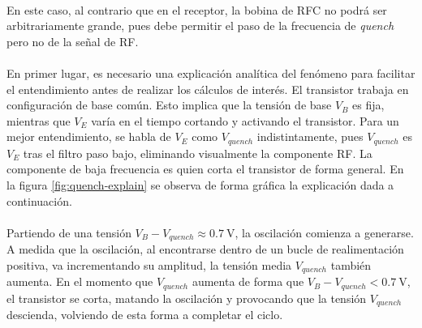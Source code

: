 \paragraph{}
En este caso, al contrario que en el receptor, la bobina de RFC no podrá ser arbitrariamente grande, pues debe permitir el paso de la frecuencia de \textit{quench} pero no de la señal de RF.
\paragraph{}
En primer lugar, es necesario una explicación analítica del fenómeno para facilitar el entendimiento antes de realizar los cálculos de interés.
El transistor trabaja en configuración de base común. Esto implica que la tensión de base $V_B$ es fija, mientras que $V_E$ varía en el tiempo cortando y activando el transistor. Para un mejor entendimiento, se habla de $V_E$ como $V_{quench}$ indistintamente, pues $V_{quench}$ es $V_E$ tras el filtro paso bajo, eliminando visualmente la componente RF. La componente de baja frecuencia es quien corta el transistor de forma general. En la figura \ref{fig:quench-explain} se observa de forma gráfica la explicación dada a continuación.
\paragraph{}
Partiendo de una tensión $V_B - V_{quench} \approx \SI{0.7}{\volt}$, la oscilación comienza a generarse.
A medida que la oscilación, al encontrarse dentro de un bucle de realimentación positiva, va incrementando su amplitud, la tensión media $V_{quench}$ también aumenta. En el momento que $V_{quench}$ aumenta de forma que $V_B - V_{quench} < \SI{0.7}{\volt}$, el transistor se corta, matando la oscilación y provocando que la tensión $V_{quench}$ descienda, volviendo de esta forma a completar el ciclo.
